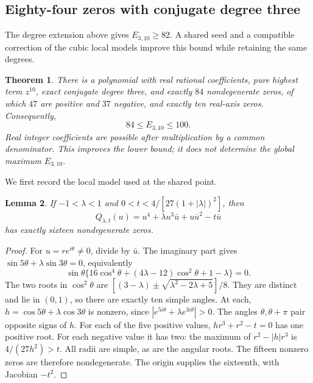 \documentclass[UTF8,11pt]{ctexart}
\newtheorem{thm}{Theorem}[section]
\newtheorem{lem}[thm]{Lemma}
\theoremstyle{definition}
\numberwithin{equation}{section}
\begin{document}
\subsection{Eighty-four zeros with conjugate degree three}
\label{v36:sec:84}

The degree extension above gives $E_{3,10}\ge82$. A shared seed
and a compatible correction of the cubic local models improve this
bound while retaining the same degrees.

\begin{thm}\label{v36:thm:84}
There is a polynomial with real rational coefficients, pure highest
term $z^{10}$, exact conjugate degree three, and exactly $84$
nondegenerate zeros, of which $47$ are positive and $37$ negative,
and exactly ten real-axis zeros.
Consequently,
\begin{equation}\label{v36:eq:bound}
                         84\le E_{3,10}\le100.
\end{equation}
Real integer coefficients are possible after multiplication by a
common denominator. This improves the lower bound; it does not
determine the global maximum $E_{3,10}$.
\end{thm}

We first record the local model used at the shared point.
\begin{lem}\label{v36:lem:quartic}
If $-1<\lambda<1$ and
$0<t<4/[27(1+|\lambda|)^2]$, then
\[
 Q_{\lambda,t}(u)=u^4+\lambda u^3\bar u+u\bar u^2-t\bar u
\]
has exactly sixteen nondegenerate zeros.
\end{lem}
\begin{proof}
For $u=re^{i\theta}\ne0$, divide by $\bar u$. The imaginary
part gives $\sin5\theta+\lambda\sin3\theta=0$, equivalently
\[
 \sin\theta\{16\cos^4\theta+(4\lambda-12)\cos^2\theta
                                  +1-\lambda\}=0.
\]
The two roots in $\cos^2\theta$ are
$[(3-\lambda)\pm\sqrt{\lambda^2-2\lambda+5}]/8$.
They are distinct and lie in $(0,1)$, so there are exactly ten
simple angles. At each, $h=\cos5\theta+\lambda\cos3\theta$
is nonzero, since $|e^{5i\theta}+\lambda e^{3i\theta}|>0$.
The angles $\theta,\theta+\pi$ pair opposite signs of $h$.
For each of the five positive values, $hr^3+r^2-t=0$ has one
positive root. For each negative value it has two: the maximum
of $r^2-|h|r^3$ is $4/(27h^2)>t$.
All radii are simple, as are the angular roots. The fifteen
nonzero zeros are therefore nondegenerate. The origin supplies
the sixteenth, with Jacobian $-t^2$.
\end{proof}
\end{document}
